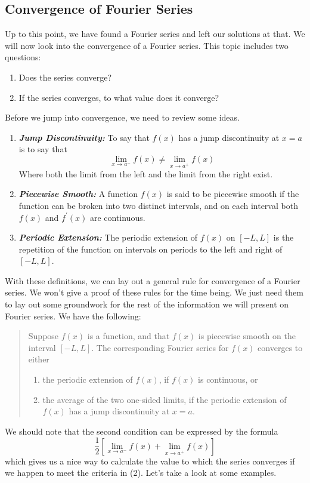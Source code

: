\documentclass{article}
\begin{document}
\subsection{Convergence of Fourier Series}
\indent Up to this point, we have found a Fourier series and left our solutions
at that. We will now look into the convergence of a Fourier series. This topic
includes two questions:
\begin{enumerate}
\item Does the series converge?
\item If the series converges, to what value does it converge?
\end{enumerate}
\noindent Before we jump into convergence, we need to review some ideas.
\begin{enumerate}
\item \textit{\textbf{Jump Discontinuity:}} To say that $f(x)$ has a jump
discontinuity at $x = a$ is to say that
\[
\lim_{x \to a^{-}}f(x) \neq \lim_{x \to a^{+}}f(x)
\]
Where both the limit from the left and the limit from the right exist.
\item \textit{\textbf{Piecewise Smooth:}} A function $f(x)$ is said to be
piecewise smooth if the function can be broken into two distinct intervals, and
on each interval both $f(x)$ and $f^{'}(x)$ are continuous.
\item \textit{\textbf{Periodic Extension:}} The periodic extension of $f(x)$ on
$[-L,L]$ is the repetition of the function on intervals on periods to the left
and right of $[-L,L]$.
\end{enumerate}
\indent With these definitions, we can lay out a general rule for convergence of
a Fourier series. We won't give a proof of these rules for the time being. We
just need them to lay out some groundwork for the rest of the information we
will present on Fourier series. We have the following:
\begin{quote}
Suppose $f(x)$ is a function, and that $f(x)$ is piecewise smooth on the interval
$[-L,L]$. The corresponding Fourier series for $f(x)$ converges to either
\begin{enumerate}
\item the periodic extension of $f(x)$, if $f(x)$ is continuous, or
\item the average of the two one-sided limits, if the periodic extension of
$f(x)$ has a jump discontinuity at $x = a$.
\end{enumerate}
\end{quote}
\noindent We should note that the second condition can be expressed by the formula
\[\frac{1}{2}\left[\lim_{x \to a^{-}}f(x) + \lim_{x \to a^{+}}f(x)\right]\]
which gives us a nice way to calculate the value to which the series converges
if we happen to meet the criteria in (2). Let's take a look at some examples.\\\\
\end{document}
